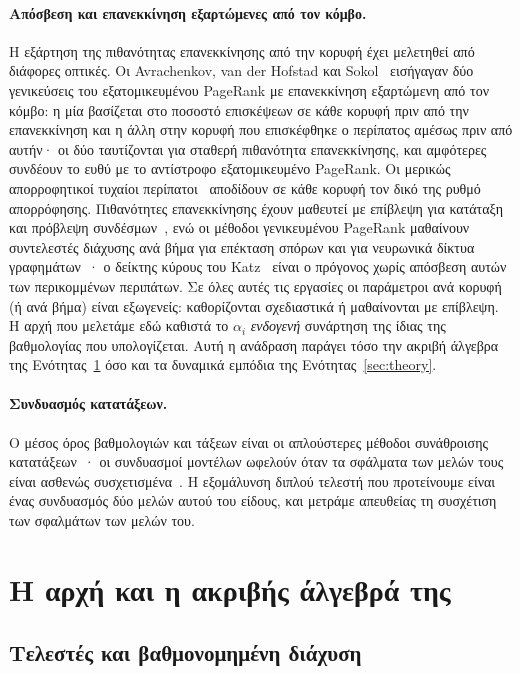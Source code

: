 \documentclass[11pt,a4paper]{article}
\theoremstyle{definition}
\theoremstyle{plain}
\begin{document}
\paragraph{Απόσβεση και επανεκκίνηση εξαρτώμενες από τον κόμβο.} Η εξάρτηση της πιθανότητας επανεκκίνησης από την κορυφή έχει μελετηθεί από διάφορες οπτικές. Οι Avrachenkov, van der Hofstad και Sokol~\cite{avrachenkov14} εισήγαγαν δύο γενικεύσεις του εξατομικευμένου PageRank με επανεκκίνηση εξαρτώμενη από τον κόμβο: η μία βασίζεται στο ποσοστό επισκέψεων σε κάθε κορυφή πριν από την επανεκκίνηση και η άλλη στην κορυφή που επισκέφθηκε ο περίπατος αμέσως πριν από αυτήν· οι δύο ταυτίζονται για σταθερή πιθανότητα επανεκκίνησης, και αμφότερες συνδέουν το ευθύ με το αντίστροφο εξατομικευμένο PageRank. Οι μερικώς απορροφητικοί τυχαίοι περίπατοι~\cite{wu12} αποδίδουν σε κάθε κορυφή τον δικό της ρυθμό απορρόφησης. Πιθανότητες επανεκκίνησης έχουν μαθευτεί με επίβλεψη για κατάταξη και πρόβλεψη συνδέσμων~\cite{jung19}, ενώ οι μέθοδοι γενικευμένου PageRank μαθαίνουν συντελεστές διάχυσης ανά βήμα για επέκταση σπόρων και για νευρωνικά δίκτυα γραφημάτων~\cite{li19gpr,gprgnn21,berberidis19}· ο δείκτης κύρους του Katz~\cite{katz53} είναι ο πρόγονος χωρίς απόσβεση αυτών των περικομμένων περιπάτων. Σε όλες αυτές τις εργασίες οι παράμετροι ανά κορυφή (ή ανά βήμα) είναι εξωγενείς: καθορίζονται σχεδιαστικά ή μαθαίνονται με επίβλεψη. Η αρχή που μελετάμε εδώ καθιστά το $\alpha_i$ \emph{ενδογενή} συνάρτηση της ίδιας της βαθμολογίας που υπολογίζεται. Αυτή η ανάδραση παράγει τόσο την ακριβή άλγεβρα της Ενότητας~\ref{sec:principle} όσο και τα δυναμικά εμπόδια της Ενότητας~\ref{sec:theory}.

\paragraph{Συνδυασμός κατατάξεων.} Ο μέσος όρος βαθμολογιών και τάξεων είναι οι απλούστερες μέθοδοι συνάθροισης κατατάξεων~\cite{dwork01}· οι συνδυασμοί μοντέλων ωφελούν όταν τα σφάλματα των μελών τους είναι ασθενώς συσχετισμένα~\cite{krogh95}. Η εξομάλυνση διπλού τελεστή που προτείνουμε είναι ένας συνδυασμός δύο μελών αυτού του είδους, και μετράμε απευθείας τη συσχέτιση των σφαλμάτων των μελών του.

\section{Η αρχή και η ακριβής άλγεβρά της}\label{sec:principle}

\subsection{Τελεστές και βαθμονομημένη διάχυση}\label{sec:operators}
\end{document}
